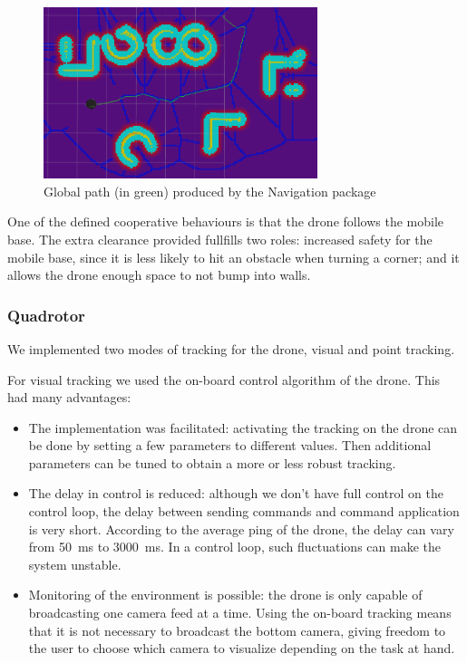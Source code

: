 \documentclass[11pt,a4paper]{article}
\begin{document}
\begin{figure}[h!]
	\centering
    \includegraphics[width=8cm]{globalplan53.png}
    \caption{Global path (in green) produced by the Navigation package}
    \label{fig:globalPath}
\end{figure}

One of the defined cooperative behaviours is that the drone follows the mobile base.  The extra clearance provided fullfills two roles: increased safety for the mobile base, since it is less likely to hit an obstacle when turning a corner; and it allows the drone enough space to not bump into walls. 


\subsubsection{Quadrotor}
We implemented two modes of tracking for the drone, visual and point tracking.

For visual tracking we used 
the on-board control algorithm of the drone. This had many advantages: 
\begin{itemize}
\item The implementation was facilitated: activating the tracking on the drone can be done by 
setting a few parameters to different values. Then additional parameters can be tuned to
obtain a more or less robust tracking.

\item The delay in control is reduced: although we don't have full control on the control
loop, the delay between sending commands and command application is very short. According to
the average ping of the drone, the delay can vary from 50~ms to 3000~ms. In a control loop,
such fluctuations can make the system unstable.

\item Monitoring of the environment is possible: the drone is only capable of broadcasting one camera feed at a time. Using the on-board tracking means that it is not necessary to broadcast the bottom camera, giving freedom to the user to choose which camera to visualize depending on the task at hand.

\end{itemize}
\end{document}
